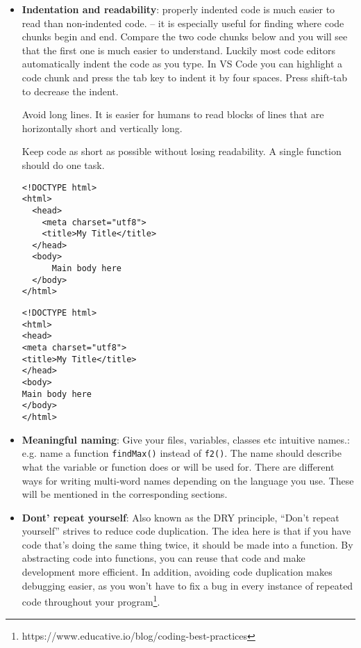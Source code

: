 \documentclass[11pt,a4paper]{report}
\newcommand{\bfb}[1]{{\bf \color{blue} #1}}
\begin{document}
\begin{itemize}
\item \bfb{Indentation and readability}: properly indented code is much easier to read than non-indented code. -- it is especially useful for finding where code chunks begin and end. Compare the two code chunks below and you will see that the first one is much easier to understand. Luckily most code editors automatically indent the code as you type.  In VS Code you can highlight a code chunk and press the tab key to indent it by four spaces. Press shift-tab to decrease the indent.

Avoid long lines. It is easier for humans to read blocks of lines that are horizontally short and vertically long. 

Keep code as short as possible without losing readability. A single function should do one task.

\newpage
\begin{multicols}{2}
\begin{lstlisting}[style=htmlcssjs]
<!DOCTYPE html>
<html>
  <head>
    <meta charset="utf8">
    <title>My Title</title>
  </head>
  <body>
      Main body here
  </body>
</html>
\end{lstlisting}

\begin{lstlisting}[style=htmlcssjs]
<!DOCTYPE html>
<html>
<head>
<meta charset="utf8">
<title>My Title</title>
</head>
<body>
Main body here
</body>
</html>
\end{lstlisting}
\end{multicols}

\item \bfb{Meaningful naming}: Give your files, variables, classes etc intuitive names.: e.g.  name a function \verb|findMax()| instead of \verb|f2()|. The name should describe what the variable or function does or will be used for. There are different ways for writing multi-word names depending on the language you use. These will be mentioned in the corresponding sections.

\item \bfb{Dont' repeat yourself}: Also known as the DRY principle, “Don’t repeat yourself” strives to reduce code duplication. The idea here is that if you have code that’s doing the same thing twice, it should be made into a function. By abstracting code into functions, you can reuse that code and make development more efficient. In addition, avoiding code duplication makes debugging easier, as you won’t have to fix a bug in every instance of repeated code throughout your program\footnote{https://www.educative.io/blog/coding-best-practices}.


\end{itemize}
\end{document}
